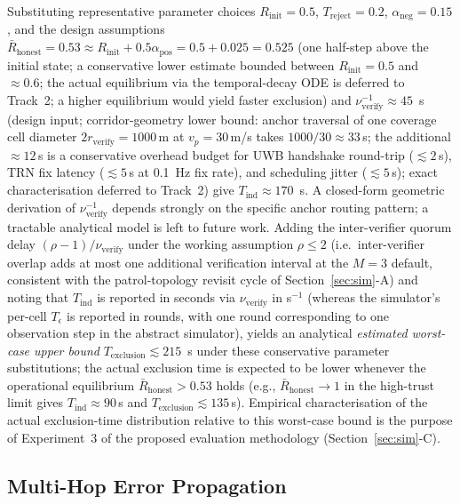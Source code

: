\documentclass[conference,10pt]{IEEEtran}
\begin{document}
Substituting representative parameter choices $R_\text{init}=0.5$, $T_\text{reject}=0.2$, $\alpha_\text{neg}=0.15$, and the design assumptions $\bar{R}_\text{honest}=0.53 \approx R_\text{init} + 0.5\alpha_\text{pos} = 0.5 + 0.025 = 0.525$ (one half-step above the initial state; a conservative lower estimate bounded between $R_\text{init}=0.5$ and $\approx 0.6$; the actual equilibrium via the temporal-decay ODE is deferred to Track~2; a higher equilibrium would yield faster exclusion) and $\nu_\text{verify}^{-1}\approx 45$~s (design input; corridor-geometry lower bound: anchor traversal of one coverage cell diameter $2r_\text{verify}=1000$\,m at $v_p=30$\,m/s takes $1000/30 \approx 33$\,s; the additional $\approx 12$\,s is a conservative overhead budget for UWB handshake round-trip ($\lesssim 2$\,s), TRN fix latency ($\lesssim 5$\,s at 0.1~Hz fix rate), and scheduling jitter ($\lesssim 5$\,s); exact characterisation deferred to Track~2) give $T_\text{ind}\approx 170$~s. A closed-form geometric derivation of $\nu_\text{verify}^{-1}$ depends strongly on the specific anchor routing pattern; a tractable analytical model is left to future work. Adding the inter-verifier quorum delay $(\rho-1)/\nu_\text{verify}$ under the working assumption $\rho \leq 2$ (i.e.\ inter-verifier overlap adds at most one additional verification interval at the $M=3$ default, consistent with the patrol-topology revisit cycle of Section~\ref{sec:sim}-A) and noting that $T_\text{ind}$ is reported in seconds via $\nu_\text{verify}$ in s$^{-1}$ (whereas the simulator's per-cell $T_\epsilon$ is reported in rounds, with one round corresponding to one observation step in the abstract simulator), yields an analytical \emph{estimated worst-case upper bound} $T_\text{exclusion}\lesssim 215$~s under these conservative parameter substitutions; the actual exclusion time is expected to be lower whenever the operational equilibrium $\bar{R}_\text{honest} > 0.53$ holds (e.g., $\bar{R}_\text{honest}\to 1$ in the high-trust limit gives $T_\text{ind} \approx 90$\,s and $T_\text{exclusion}\lesssim 135$\,s). Empirical characterisation of the actual exclusion-time distribution relative to this worst-case bound is the purpose of Experiment~3 of the proposed evaluation methodology (Section~\ref{sec:sim}-C).

\subsection{Multi-Hop Error Propagation}
\end{document}
